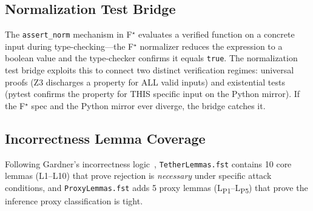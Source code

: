 \documentclass[sigplan,screen,nonacm]{acmart}
\newcommand{\fstar}{F\ensuremath{^\star}}
\begin{document}
\subsection{Normalization Test Bridge}

The \texttt{assert\_norm} mechanism in \fstar{} evaluates a verified
function on a concrete input during type-checking---the \fstar{} normalizer
reduces the expression to a boolean value and the type-checker confirms it
equals \texttt{true}. The normalization test bridge exploits this to connect
two distinct verification regimes: universal proofs (Z3 discharges a
property for ALL valid inputs) and existential tests (pytest confirms the
property for THIS specific input on the Python mirror). If the \fstar{} spec
and the Python mirror ever diverge, the bridge catches it.

\subsection{Incorrectness Lemma Coverage}

Following Gardner's incorrectness logic~\cite{gardner2026incorrectness},
\texttt{TetherLemmas.fst} contains 10 core lemmas (L1--L10) that prove
rejection is \emph{necessary} under specific attack conditions, and
\texttt{ProxyLemmas.fst} adds 5 proxy lemmas (L\textsubscript{P1}--L\textsubscript{P5})
that prove the inference proxy classification is tight.
\end{document}
